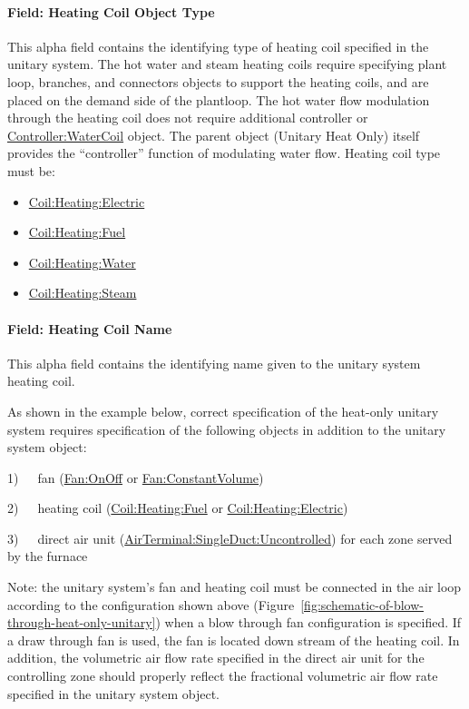 \paragraph{Field: Heating Coil Object Type}\label{field-heating-coil-object-type-6}

This alpha field contains the identifying type of heating coil specified in the unitary system. The hot water and steam heating coils require specifying plant loop, branches, and connectors objects to support the heating coils, and are placed on the demand side of the plantloop. The hot water flow modulation through the heating coil does not require additional controller or \hyperref[controllerwatercoil]{Controller:WaterCoil} object. The parent object (Unitary Heat Only) itself provides the ``controller'' function of modulating water flow. Heating coil type must be:

\begin{itemize}
\item
  \hyperref[coilheatingelectric]{Coil:Heating:Electric}
\item
  \hyperref[coilheatinggas-000]{Coil:Heating:Fuel}
\item
  \hyperref[coilheatingwater]{Coil:Heating:Water}
\item
  \hyperref[coilheatingsteam]{Coil:Heating:Steam}
\end{itemize}

\paragraph{Field: Heating Coil Name}\label{field-heating-coil-name-6}

This alpha field contains the identifying name given to the unitary system heating coil.

As shown in the example below, correct specification of the heat-only unitary system requires specification of the following objects in addition to the unitary system object:

1)~~~fan (\hyperref[fanonoff]{Fan:OnOff} or \hyperref[fanconstantvolume]{Fan:ConstantVolume})

2)~~~heating coil (\hyperref[coilheatinggas-000]{Coil:Heating:Fuel} or \hyperref[coilheatingelectric]{Coil:Heating:Electric})

3)~~~direct air unit (\hyperref[airterminalsingleductuncontrolled]{AirTerminal:SingleDuct:Uncontrolled}) for each zone served by the furnace

Note: the unitary system's fan and heating coil must be connected in the air loop according to the configuration shown above (Figure~\ref{fig:schematic-of-blow-through-heat-only-unitary}) when a blow through fan configuration is specified. If a draw through fan is used, the fan is located down stream of the heating coil. In addition, the volumetric air flow rate specified in the direct air unit for the controlling zone should properly reflect the fractional volumetric air flow rate specified in the unitary system object.

